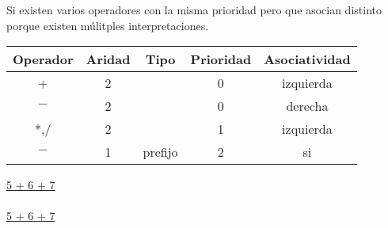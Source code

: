 \documentclass[\main/ApuntesPL.tex]{subfiles}
\begin{document}
      \par
      Si existen varios operadores con la misma prioridad pero que asocian distinto porque existen
      múlitples interpretaciones.
      \begin{center}
        \begin{minipage}{.65\textwidth}
          \begin{tabular}{||c c c c c||}
            \hline
            Operador & Aridad & Tipo & Prioridad & Asociatividad \\ [0.5ex]
            \hline\hline
            + & 2 &  & 0 & izquierda \\
            \hline
            $-$ & 2 &  & 0 & derecha \\
            \hline
            *,/ & 2 &  & 1 & izquierda \\
            \hline
            $-$ & 1 & prefijo & 2 & si \\ [1ex]
            \hline
          \end{tabular}
        \end{minipage}%
        \begin{minipage}{.35\textwidth}
          \hspace*{10mm}\underline{5 + \underline{6 + 7}}\\\\
          \hspace*{10mm}\underline{\underline{5 + 6} + 7}
        \end{minipage}
      \end{center}
\end{document}
